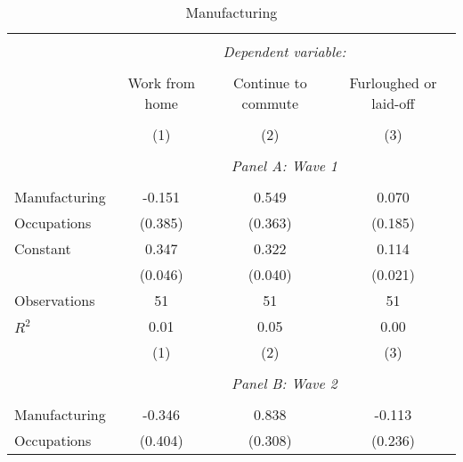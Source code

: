 \begin{table}[!htbp] \centering                    \caption{Manufacturing}                    \label{tab:priorindustrymanuf}                  \small                  \begin{tabular}{@{\extracolsep{5pt}}lccc}                  \\[-1.8ex]\hline                  \hline \\[-1.8ex]                   & \multicolumn{3}{c}{\textit{Dependent variable:}} \\                   \cline{2-4}                   \\[-1.8ex] & Work from home & Continue to commute & Furloughed or laid-off \\                   \hline \\[-1.8ex]               
                    &\multicolumn{1}{c}{(1)}         &\multicolumn{1}{c}{(2)}         &\multicolumn{1}{c}{(3)}         \\
\hline \\               & \multicolumn{3}{c}{\textit{Panel A: Wave 1}} \\               \addlinespace[1mm] \\
Manufacturing       &      -0.151         &       0.549         &       0.070         \\
Occupations         &     (0.385)         &     (0.363)         &     (0.185)         \\
[1em]
Constant            &       0.347\sym{***}&       0.322\sym{***}&       0.114\sym{***}\\
                    &     (0.046)         &     (0.040)         &     (0.021)         \\
[1em]
Observations        &          51         &          51         &          51         \\
\(R^{2}\)           &        0.01         &        0.05         &        0.00         \\
                    &\multicolumn{1}{c}{(1)}         &\multicolumn{1}{c}{(2)}         &\multicolumn{1}{c}{(3)}         \\
\hline \\               & \multicolumn{3}{c}{\textit{Panel B: Wave 2}} \\               \addlinespace[1mm] \\
Manufacturing       &      -0.346         &       0.838\sym{***}&      -0.113         \\
Occupations         &     (0.404)         &     (0.308)         &     (0.236)         \\

\end{tabular}
\end{table}
